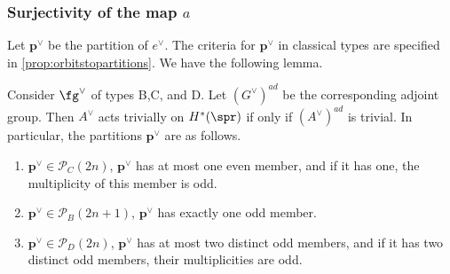 \documentclass[12pt]{amsart}
\begin{document}
\subsubsection{Surjectivity of the map $a$}
Let $\mathbf{p}^\vee$ be the partition of $e^\vee$. The criteria for $\mathbf{p}^\vee$ in classical types are specified in \cref{prop:orbitstopartitions}. We have the following lemma.%
\begin{lemma} \label{when A acts trivially}
    Consider $\fg^\vee$ of types B,C, and D. Let $(G^\vee)^{ad}$ be the corresponding adjoint group. Then 
     $A^\vee$ acts trivially on $H^*(\spr)$ if only if $(A^\vee)^{ad}$ is trivial. In particular, the partitions $\mathbf{p}^\vee$ are as follows.
    \begin{enumerate}
        \item $\mathbf{p}^\vee \in \mathcal{P}_{C}(2n)$, $\mathbf{p}^\vee$ has at most one even member, and if it has one, the multiplicity of this member is odd.
        \item $\mathbf{p}^\vee\in \mathcal{P}_{B}(2n+1)$, $\mathbf{p}^\vee$ has exactly one odd member.
        \item $\mathbf{p}^\vee\in \mathcal{P}_{D}(2n)$, $\mathbf{p}^\vee$ has at most two distinct odd members, and if it has two distinct odd members, their multiplicities are odd.
    \end{enumerate}
\end{lemma}
\end{document}
